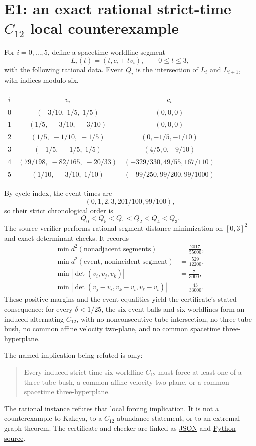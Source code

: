 \documentclass[11pt]{article}
\newcommand{\assetpath}{../assets/yuanjiang_kakeya_recollision_assets_2026-08-11/unpacked/}
\begin{document}
\section{E1: an exact rational strict-time \texorpdfstring{$C_{12}$}{C12} local counterexample}
\label{sec:c12}

For $i=0,\ldots,5$, define a spacetime worldline segment
\[
  L_i(t)=(t,c_i+t v_i),\qquad 0\le t\le 3,
\]
with the following rational data. Event $Q_i$ is the intersection of $L_i$ and $L_{i+1}$, with indices modulo six.

\begin{center}
\small
\begin{tabular}{c c c}
\toprule
$i$ & $v_i$ & $c_i$ \\
\midrule
0 & $(-3/10,\;1/5,\;1/5)$ & $(0,0,0)$ \\
1 & $(1/5,\;-3/10,\;-3/10)$ & $(0,0,0)$ \\
2 & $(1/5,\;-1/10,\;-1/5)$ & $(0,-1/5,-1/10)$ \\
3 & $(-1/5,\;-1/5,\;1/5)$ & $(4/5,0,-9/10)$ \\
4 & $(79/198,\;-82/165,\;-20/33)$ & $(-329/330,49/55,167/110)$ \\
5 & $(1/10,\;-3/10,\;1/10)$ & $(-99/250,99/200,99/1000)$ \\
\bottomrule
\end{tabular}
\end{center}

By cycle index, the event times are
\[
  (0,1,2,3,201/100,99/100),
\]
so their strict chronological order is
\[
  Q_0<Q_5<Q_1<Q_2<Q_4<Q_3.
\]
The source verifier performs rational segment-distance minimization on $[0,3]^2$ and exact determinant checks. It records
\[
\begin{aligned}
 \min d^2(\text{nonadjacent segments})&=\frac{2017}{55600},\\
 \min d^2(\text{event, nonincident segment})&=\frac{529}{12200},\\
 \min |\det(v_i,v_j,v_k)|&=\frac{7}{3000},\\
 \min |\det(v_j-v_i,v_k-v_i,v_\ell-v_i)|&=\frac{43}{33000}.
\end{aligned}
\]
These positive margins and the event equalities yield the certificate's stated consequence: for every $\delta<1/25$, the six event balls and six worldlines form an induced alternating $C_{12}$, with no nonconsecutive tube intersection, no three-tube bush, no common affine velocity two-plane, and no common spacetime three-hyperplane.

The named implication being refuted is only:
\begin{quote}
Every induced strict-time six-worldline $C_{12}$ must force at least one of a three-tube bush, a common affine velocity two-plane, or a common spacetime three-hyperplane.
\end{quote}
The rational instance refutes that local forcing implication. It is not a counterexample to Kakeya, to a $C_{12}$-abundance statement, or to an extremal graph theorem. The certificate and checker are linked as
\href{\assetpath strict_time_c12_worldline_certificate.json}{JSON} and
\href{\assetpath verify_strict_time_c12_worldlines.py}{Python source}.
\end{document}
